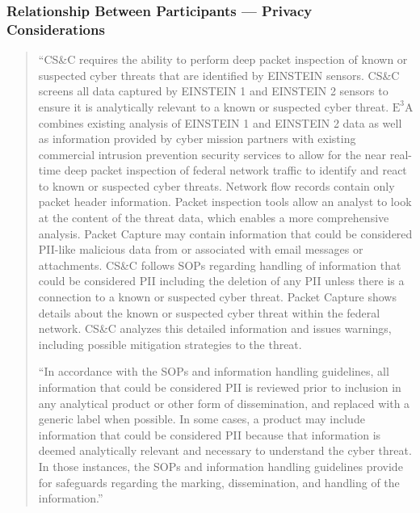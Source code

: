 \documentclass[fleqn,10pt]{wlscirep}
\newcommand{\ETA}{$\textrm{E}^\textrm{3}\textrm{A}$\xspace}
\begin{document}
\subsubsection{Relationship Between Participants --- Privacy Considerations}\label{excerpt1}
\begin{quote}
  ``CS\&C requires the ability to perform deep packet inspection of known or
suspected cyber threats that are identified by EINSTEIN sensors. CS\&C screens all data
captured by EINSTEIN 1 and EINSTEIN 2 sensors to ensure it is analytically relevant to
a known or suspected cyber threat. \ETA combines existing analysis of EINSTEIN 1 and
EINSTEIN 2 data as well as information provided by cyber mission partners with
existing commercial intrusion prevention security services to allow for the near real-time
deep packet inspection of federal network traffic to identify and react to known or
suspected cyber threats. Network flow records contain only packet header information.
Packet inspection tools allow an analyst to look at the content of the threat data, which
enables a more comprehensive analysis. Packet Capture may contain information that
could be considered PII-like malicious data from or associated with email messages or
attachments. CS\&C follows SOPs regarding handling of information that could be
considered PII including the deletion of any PII unless there is a connection to a known
or suspected cyber threat. Packet Capture shows details about the known or suspected
cyber threat within the federal network. CS\&C analyzes this detailed information and
issues warnings, including possible mitigation strategies to the threat.

  ``In accordance with the SOPs and information handling guidelines, all information
that could be considered PII is reviewed prior to inclusion in any analytical product or
other form of dissemination, and replaced with a generic label when possible. In some
cases, a product may include information that could be considered PII because that
information is deemed analytically relevant and necessary to understand the cyber threat.
In those instances, the SOPs and information handling guidelines provide for safeguards
regarding the marking, dissemination, and handling of the
information.''\cite[p.9]{dhs-e3a-pia}
\end{quote}
\end{document}
